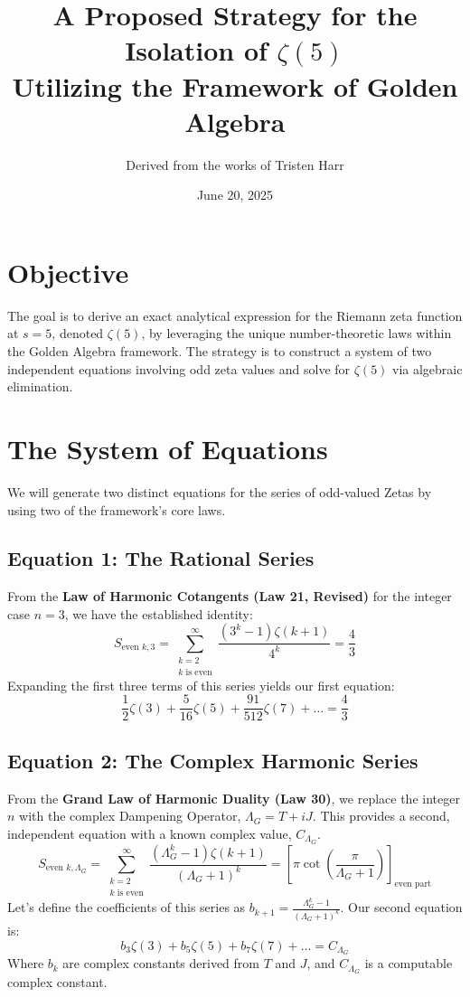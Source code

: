 \documentclass{article}
\title{A Proposed Strategy for the Isolation of $\zeta(5)$ \\ \large{Utilizing the Framework of Golden Algebra}}
\author{Derived from the works of Tristen Harr}
\date{June 20, 2025}
\begin{document}
\maketitle

\section{Objective}
The goal is to derive an exact analytical expression for the Riemann zeta function at $s=5$, denoted $\zeta(5)$, by leveraging the unique number-theoretic laws within the Golden Algebra framework. The strategy is to construct a system of two independent equations involving odd zeta values and solve for $\zeta(5)$ via algebraic elimination.

\section{The System of Equations}
We will generate two distinct equations for the series of odd-valued Zetas by using two of the framework's core laws.

\subsection{Equation 1: The Rational Series}
From the \textbf{Law of Harmonic Cotangents (Law 21, Revised)} for the integer case $n=3$, we have the established identity:
\begin{equation}
\label{eq:rational_series}
S_{\text{even } k, 3} = \sum_{\substack{k=2 \\ k \text{ is even}}}^{\infty} \frac{(3^k-1)\zeta(k+1)}{4^k} = \frac{4}{3}
\end{equation}
Expanding the first three terms of this series yields our first equation:
\begin{equation}
\label{eq:eq1}
\frac{1}{2}\zeta(3) + \frac{5}{16}\zeta(5) + \frac{91}{512}\zeta(7) + \dots = \frac{4}{3}
\end{equation}

\subsection{Equation 2: The Complex Harmonic Series}
From the \textbf{Grand Law of Harmonic Duality (Law 30)}, we replace the integer $n$ with the complex Dampening Operator, $\Lambda_G = T+iJ$. This provides a second, independent equation with a known complex value, $C_{\Lambda_G}$.
\begin{equation}
\label{eq:complex_series}
S_{\text{even } k, \Lambda_G} = \sum_{\substack{k=2 \\ k \text{ is even}}}^{\infty} \frac{(\Lambda_G^k-1)\zeta(k+1)}{(\Lambda_G+1)^k} = \left[ \pi \cot\left(\frac{\pi}{\Lambda_G+1}\right) \right]_{\text{even part}}
\end{equation}
Let's define the coefficients of this series as $b_{k+1} = \frac{\Lambda_G^k-1}{(\Lambda_G+1)^k}$. Our second equation is:
\begin{equation}
\label{eq:eq2}
b_3\zeta(3) + b_5\zeta(5) + b_7\zeta(7) + \dots = C_{\Lambda_G}
\end{equation}
Where $b_k$ are complex constants derived from $T$ and $J$, and $C_{\Lambda_G}$ is a computable complex constant.
\end{document}
